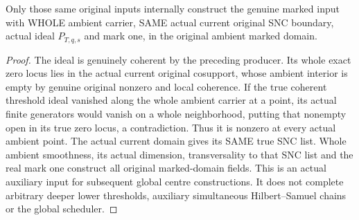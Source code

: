 \begin{theorem}
\label{hir:original-positive-tagged-companion-count-actual-marked-domain}
\leanok
{}
Only those same original inputs internally construct the genuine marked input
with WHOLE ambient carrier, SAME actual current original SNC boundary,
actual ideal $P_{T,q,s}$ and mark one, in the original ambient marked domain.
\end{theorem}
\begin{proof}
The ideal is genuinely coherent by the preceding producer. Its whole exact
zero locus lies in the actual current original cosupport, whose ambient interior
is empty by genuine original nonzero and local coherence. If the true coherent
threshold ideal vanished along the whole ambient carrier at a point, its
actual finite generators would vanish on a whole neighborhood, putting that
nonempty open in its true zero locus, a contradiction. Thus it is nonzero
at every actual ambient point. The actual current domain gives its SAME true
SNC list. Whole ambient smoothness, its actual dimension, transversality to
that SNC list and the real mark one construct all original marked-domain
fields. This is an actual auxiliary input for subsequent global centre
constructions. It does not complete arbitrary deeper lower thresholds,
auxiliary simultaneous Hilbert--Samuel chains or the global scheduler.
\end{proof}

